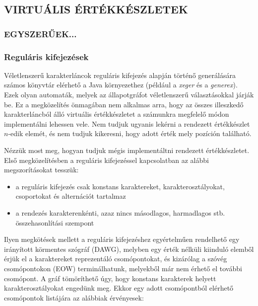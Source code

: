 \documentclass[
    parspace,
    noindent,
    nohyp,
]{elteiktdk}[2023/04/10]
\begin{document}

\subsection{VIRTUÁLIS ÉRTÉKKÉSZLETEK}

\subsubsection{EGYSZERŰEK...}


\subsubsection{Reguláris kifejezések}

Véletlenszerű karakterláncok reguláris kifejezés alapján történő generálására
számos könyvtár elérhető a Java környezethez
(például a \textit{xeger} és a \textit{generex}).
Ezek olyan automaták, melyek az állapotgráfot véletlenszerű választásokkal járják be.
Ez a megközelítés önmagában nem alkalmas arra,
hogy az összes illeszkedő karakterláncból álló virtuális értékkészletet
a számunkra megfelelő módon implementálni lehessen vele.
Nem tudjuk ugyanis lekérni a rendezett értékkészlet $n$-edik elemét,
és nem tudjuk kikeresni, hogy adott érték mely pozíción található.

Nézzük most meg, hogyan tudjuk mégis implementáltni rendezett értékkészletet.
Első megközelítésben a reguláris kifejezéssel kapcsolatban az alábbi megszorításokat tesszük:

\begin{itemize}
    \item a reguláris kifejezés csak konstans karaktereket, karakterosztályokat, csoportokat és alternációt tartalmaz
    \item a rendezés karakterenkénti, azaz nincs másodlagos, harmadlagos stb. összehasonlítási szempont
\end{itemize}

Ilyen megkötések mellett a reguláris kifejezéshez egyértelműen rendelhető egy
irányított körmentes szógráf (DAWG),
melyben egy érték nélküli kiinduló elemből érjük el a karaktereket reprezentáló csomópontokat,
és kizárólag a szóvég csomópontokon (EOW) terminálhatunk,
melyekből már nem érhető el további csomópont.
A gráf tömöríthető úgy, hogy konstans karakterek helyett karakterosztályokat engedünk meg.
Ekkor egy adott csomópontból elérhető csomópontok listájára az alábbiak érvényesek:
\end{document}
